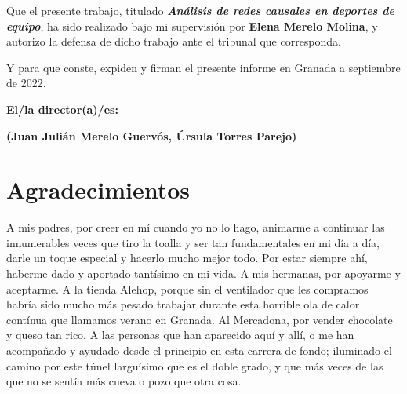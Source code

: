 Que el presente trabajo, titulado \textit{\textbf{Análisis de redes causales en deportes de equipo}},
ha sido realizado bajo mi supervisión por \textbf{Elena Merelo Molina}, y autorizo la defensa de dicho 
trabajo ante el tribunal que corresponda.

\vspace{0.5cm}

Y para que conste, expiden y firman el presente informe en Granada a septiembre de 2022.

\vspace{1cm}

\textbf{El/la director(a)/es: }

\vspace{5cm}

\noindent \textbf{(Juan Julián Merelo Guervós, Úrsula Torres Parejo)}

\chapter*{Agradecimientos}

A mis padres, por creer en mí cuando yo no lo hago, animarme a continuar las innumerables veces que tiro la 
toalla y ser tan fundamentales en mi día a día, darle un toque especial y hacerlo mucho mejor todo. Por estar 
siempre ahí, haberme dado y aportado tantísimo en mi vida. A mis hermanas, por apoyarme y aceptarme. A la 
tienda Alehop, porque sin el ventilador que les compramos habría sido mucho más pesado trabajar durante 
esta horrible ola de calor contínua que llamamos verano en Granada. Al Mercadona, por vender chocolate y 
queso tan rico. A las personas que han aparecido aquí y allí, o me han acompañado y ayudado desde el principio 
en esta carrera de fondo; iluminado el camino por este túnel larguísimo que es el doble grado, y que más 
veces de las que no se sentía más cueva o pozo que otra cosa. 


